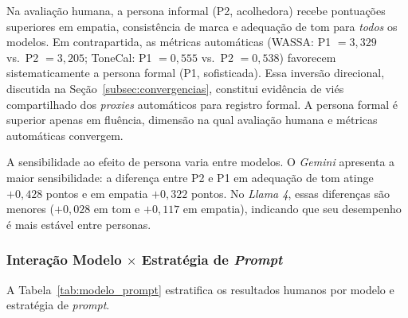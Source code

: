 \documentclass[12pt, a4paper]{article}
\numberwithin{equation}{section}
\begin{document}
Na avaliação humana, a persona informal (P2, acolhedora) recebe pontuações superiores em empatia, consistência de marca e adequação de tom para \textit{todos} os modelos. Em contrapartida, as métricas automáticas (WASSA: P1 $= 3{,}329$ vs.\ P2 $= 3{,}205$; ToneCal: P1 $= 0{,}555$ vs.\ P2 $= 0{,}538$) favorecem sistematicamente a persona formal (P1, sofisticada). Essa inversão direcional, discutida na Seção~\ref{subsec:convergencias}, constitui evidência de viés compartilhado dos \textit{proxies} automáticos para registro formal. A persona formal é superior apenas em fluência, dimensão na qual avaliação humana e métricas automáticas convergem.

A sensibilidade ao efeito de persona varia entre modelos. O \textit{Gemini} apresenta a maior sensibilidade: a diferença entre P2 e P1 em adequação de tom atinge $+0{,}428$ pontos e em empatia $+0{,}322$ pontos. No \textit{Llama 4}, essas diferenças são menores ($+0{,}028$ em tom e $+0{,}117$ em empatia), indicando que seu desempenho é mais estável entre personas.

\subsubsection{Interação Modelo $\times$ Estratégia de \textit{Prompt}}

A Tabela~\ref{tab:modelo_prompt} estratifica os resultados humanos por modelo e estratégia de \textit{prompt}.

\begin{table}[H]
\centering
\caption{Avaliação Humana por Modelo e Estratégia de \textit{Prompt} (escala Likert 1--5)}
\label{tab:modelo_prompt}
\end{table}
\end{document}
